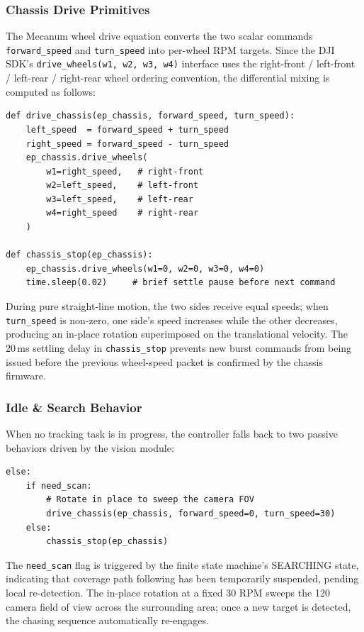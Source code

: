 \subsubsection{Chassis Drive Primitives}

The Mecanum wheel drive equation converts the two scalar commands \texttt{forward\_speed} and \texttt{turn\_speed}
into per-wheel RPM targets.
Since the DJI SDK's \texttt{drive\_wheels(w1, w2, w3, w4)} interface uses the
right-front / left-front / left-rear / right-rear wheel ordering convention, the differential mixing is computed as follows:

\begin{verbatim}
def drive_chassis(ep_chassis, forward_speed, turn_speed):
    left_speed  = forward_speed + turn_speed
    right_speed = forward_speed - turn_speed
    ep_chassis.drive_wheels(
        w1=right_speed,   # right-front
        w2=left_speed,    # left-front
        w3=left_speed,    # left-rear
        w4=right_speed    # right-rear
    )

def chassis_stop(ep_chassis):
    ep_chassis.drive_wheels(w1=0, w2=0, w3=0, w4=0)
    time.sleep(0.02)     # brief settle pause before next command
\end{verbatim}

During pure straight-line motion, the two sides receive equal speeds; when \texttt{turn\_speed} is non-zero, one side's speed increases while the other decreases,
producing an in-place rotation superimposed on the translational velocity. The 20\,ms
settling delay in \texttt{chassis\_stop} prevents new burst commands from being issued before the previous wheel-speed packet is confirmed by the chassis firmware.

\subsubsection{Idle \& Search Behavior}

When no tracking task is in progress, the controller falls back to two passive behaviors driven by the vision module:

\begin{verbatim}
else:
    if need_scan:
        # Rotate in place to sweep the camera FOV
        drive_chassis(ep_chassis, forward_speed=0, turn_speed=30)
    else:
        chassis_stop(ep_chassis)
\end{verbatim}

The \texttt{need\_scan} flag is triggered by the finite state machine's SEARCHING state, indicating that coverage path following
has been temporarily suspended, pending local re-detection. The in-place rotation at a fixed 30 RPM sweeps the 120\textdegree{} camera field of view across
the surrounding area; once a new target is detected, the chasing sequence automatically re-engages.